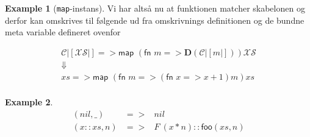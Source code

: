 \documentclass[oneside]{memoir}
\theoremstyle{definition}
\newtheorem{example}{Example}
\begin{document}
\begin{example}[\texttt{map}-instans]
  Vi har altså nu at funktionen matcher skabelonen og derfor kan omskrives til
  følgende ud fra omskrivnings definitionen og de bundne meta variable defineret
  ovenfor

  \begin{eqnarray*}[c]
      \mathcal{C}|[\mathcal{X\!S}|] => \textsf{map } \left( \textsf{fn } m =>
    \mathbf{D}\left( \mathcal{C}|[m|] \right) \right) \mathcal{X\!S} \\
  \Downarrow \\
  xs => \textsf{map } \left( \textsf{fn } m =>
    \left( \textsf{fn } x => x + 1 \right) m \right) xs \\
  \end{eqnarray*}

\end{example}


\begin{example}
  \begin{eqnarray*}
    (nil, \_) &=>& nil\\
    (x::xs, n) &=>& F\ (x * n) :: \mathsf{foo} (xs, n)\\
  \end{eqnarray*}
\end{example}
\end{document}

